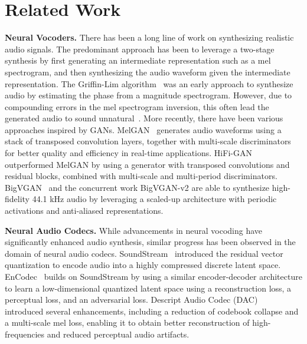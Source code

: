 \section{Related Work}
\label{sec:related-work}

\textbf{Neural Vocoders.} There has been a long line of work on synthesizing realistic audio signals. The predominant approach has been to leverage a two-stage synthesis by first generating an intermediate representation such as a mel spectrogram, and then synthesizing the audio waveform given the intermediate representation. The Griffin-Lim algorithm~\cite{griffin1984signal} was an early approach to synthesize audio by estimating the phase from a magnitude spectrogram. However, due to compounding errors in the mel spectrogram inversion, this often lead the generated audio to sound unnatural~\cite{wang2017tacotron}. More recently, there have been various approaches inspired by GANs. MelGAN~\cite{kumar2019melgan} generates audio waveforms using a stack of transposed convolution layers, together with multi-scale discriminators for better quality and efficiency in real-time applications. HiFi-GAN~\cite{HiFiGAN} outperformed MelGAN by using a generator with transposed convolutions and residual blocks, combined with multi-scale and multi-period discriminators. BigVGAN~\cite{BigVGAN} and the concurrent work BigVGAN-v2 are able to synthesize high-fidelity 44.1 kHz audio by leveraging a scaled-up architecture with periodic activations and anti-aliased representations.

\textbf{Neural Audio Codecs.} While advancements in neural vocoding have significantly enhanced audio synthesis, similar progress has been observed in the domain of neural audio codecs. SoundStream~\cite{zeghidour2021soundstream} introduced the residual vector quantization to encode audio into a highly compressed discrete latent space. EnCodec~\cite{EnCodec} builds on SoundStream by using a similar encoder-decoder architecture to learn a low-dimensional quantized latent space using a reconstruction loss, a perceptual loss, and an adversarial loss. Descript Audio Codec (DAC)~\cite{DAC} introduced several enhancements, including a reduction of codebook collapse and a multi-scale mel loss, enabling it to obtain better reconstruction of high-frequencies and reduced perceptual audio artifacts.